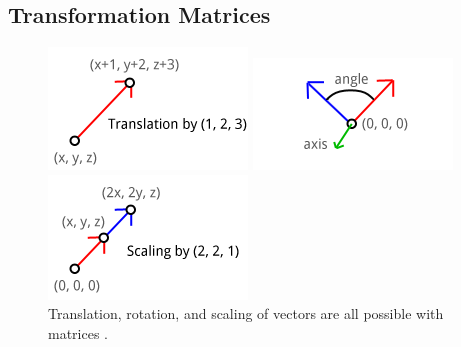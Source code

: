\subsection{Transformation Matrices}
\begin{figure}
	\centering
	\begin{minipage}{.33\textwidth}
		\centering
		\includegraphics[width=\linewidth]{Figures/Translation.png}
	\end{minipage}
	\begin{minipage}{.33\textwidth}
		\centering
		\includegraphics[width=\linewidth]{Figures/Rotation.png}
	\end{minipage}
	\begin{minipage}{.33\textwidth}
		\centering
		\includegraphics[width=\linewidth]{Figures/Scaling.png}
	\end{minipage}
	\decoRule
	\caption{Translation, rotation, and scaling of vectors are all possible with matrices \cite{OpenGLMatrices}.}
	\label{fig:Transformations}
\end{figure}

